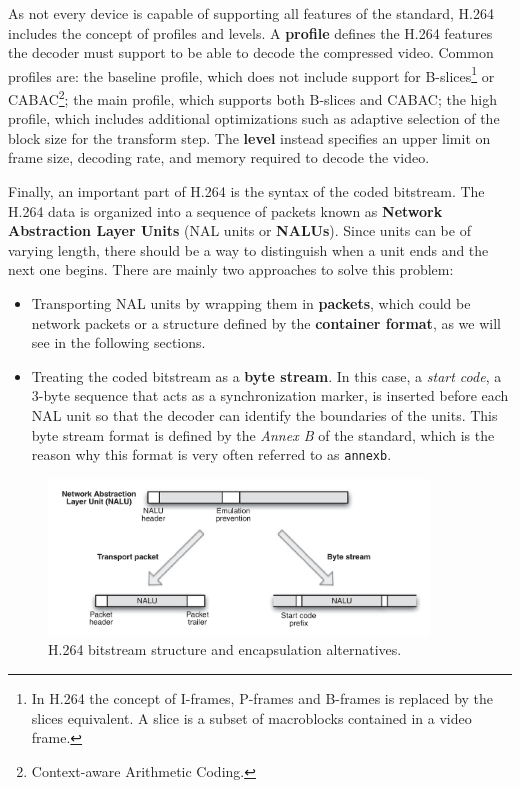 As not every device is capable of supporting all features of the standard, H.264 includes the concept of profiles and levels. A \textbf{profile} defines the H.264 features the decoder must support to be able to decode the compressed video. Common profiles are: the baseline profile, which does not include support for B-slices\footnote{In H.264 the concept of I-frames, P-frames and B-frames is replaced by the slices equivalent. A slice is a subset of macroblocks contained in a video frame.} or CABAC\footnote{Context-aware Arithmetic Coding.}; the main profile, which supports both B-slices and CABAC; the high profile, which includes additional optimizations such as adaptive selection of the block size for the transform step. The \textbf{level} instead specifies an upper limit on frame size, decoding rate, and memory required to decode the video.

Finally, an important part of H.264 is the syntax of the coded bitstream. The H.264 data is organized into a sequence of packets known as \textbf{Network Abstraction Layer Units} (NAL units or \textbf{NALUs}). Since units can be of varying length, there should be a way to distinguish when a unit ends and the next one begins. There are mainly two approaches to solve this problem:

\begin{itemize}
    \item Transporting NAL units by wrapping them in \textbf{packets}, which could be network packets or a structure defined by the \textbf{container format}, as we will see in the following sections.
    \item Treating the coded bitstream as a \textbf{byte stream}. In this case, a \textit{start code}, a 3-byte sequence that acts as a synchronization marker, is inserted before each NAL unit so that the decoder can identify the boundaries of the units. This byte stream format is defined by the \textit{Annex B} of the standard, which is the reason why this format is very often referred to as \texttt{annexb}.
\end{itemize}

\begin{figure}
	\centering
	
	\includegraphics[width=0.9\textwidth]{res/h264_nalu.png}
	
	\caption{H.264 bitstream structure and encapsulation alternatives.}
	\label{fig:h264_encapsulation}
\end{figure}

